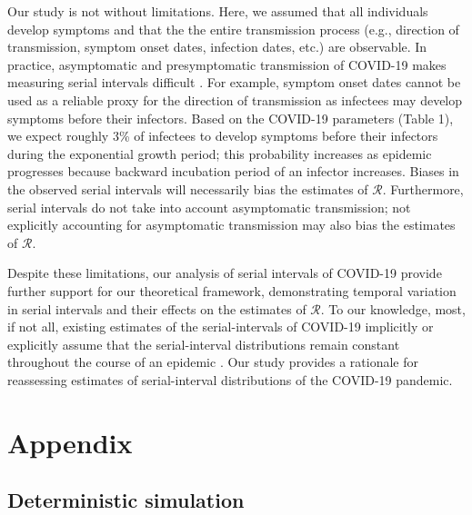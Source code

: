 \documentclass[12pt]{article}
\newcommand{\RR}{\ensuremath{{\mathcal R}}\xspace}
\begin{document}
Our study is not without limitations.
Here, we assumed that all individuals develop symptoms and that the the entire transmission process (e.g., direction of transmission, symptom onset dates, infection dates, etc.) are observable.
In practice, asymptomatic and presymptomatic transmission of COVID-19 makes measuring serial intervals difficult \citep{bai2020presumed,he2020temporal,wei2020presymptomatic}.
For example, symptom onset dates cannot be used as a reliable proxy for the direction of transmission as infectees may develop symptoms before their infectors.
Based on the COVID-19 parameters (Table 1), we expect roughly 3\% of infectees to develop symptoms before their infectors during the exponential growth period; 
this probability increases as epidemic progresses because backward incubation period of an infector increases.
Biases in the observed serial intervals will necessarily bias the estimates of \RR. 
Furthermore, serial intervals do not take into account asymptomatic transmission; 
not explicitly accounting for asymptomatic transmission may also bias the estimates of \RR \citep{park2020time}.

Despite these limitations, our analysis of serial intervals of COVID-19 provide further support for our theoretical framework, demonstrating temporal variation in serial intervals and their effects on the estimates of \RR.
To our knowledge, most, if not all, existing estimates of the serial-intervals of COVID-19 implicitly or explicitly assume that the serial-interval distributions remain constant throughout the course of an epidemic \citep{du2020serial, he2020temporal, nishiura2020serial,tindale2020transmission,zhao2020estimating,zhang2020evolving}.
Our study provides a rationale for reassessing estimates of serial-interval distributions of the COVID-19 pandemic.

\pagebreak

\section{Appendix}

\subsection{Deterministic simulation}
\end{document}
